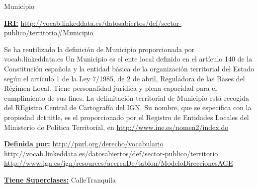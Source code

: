 \begin{mybox}{Municipio}
\begin{flushleft}
\underline{\textbf{IRI:}}
\url{http://vocab.linkeddata.es/datosabiertos/def/sector-publico/territorio#Municipio}
\newline

Se ha reutilizado la definición de Municipio proporcionada por vocab.linkeddata.es \cite{datoabiertos_municipio}
Un Municipio es el ente local definido en el artículo 140 de la Constitución española y la entidad básica de la organización territorial del Estado según el artículo 1 de la Ley 7/1985, de 2 de abril, Reguladora de las Bases del Régimen Local. Tiene personalidad jurídica y plena capacidad para el cumplimiento de sus fines. La delimitación territorial de Municipio está recogida del REgistro Central de Cartografía del IGN. Su nombre, que se especifica con la propiedad dct:title, es el proporcionado por el Registro de Entidades Locales del Ministerio de Política Territorial, en \url{http://www.ine.es/nomen2/index.do}
\newline


\underline{\textbf{Definida por:}}
\url{http://purl.org/derecho/vocabulario}
\url{http://vocab.linkeddata.es/datosabiertos/def/sector-publico/territorio}
\url{http://www.ign.es/ign/resources/acercaDe/tablon/ModeloDireccionesAGE}
\newline

\underline{\textbf{Tiene Superclases:}}
\newline CalleTranquila



\end{flushleft}
\end{mybox}





